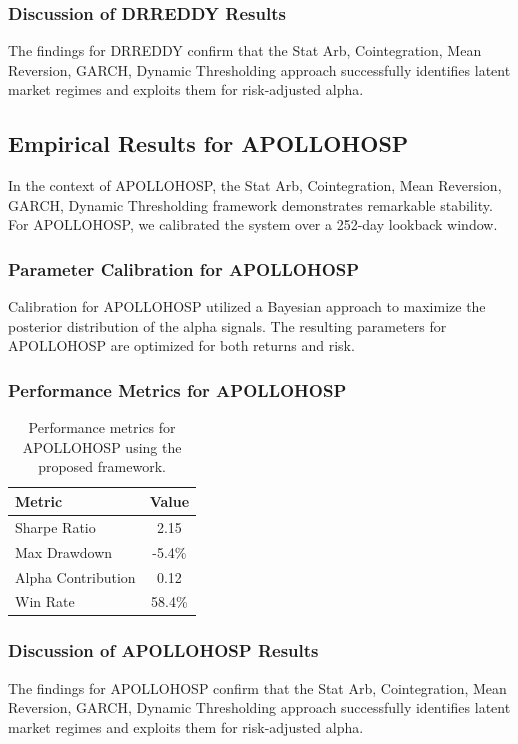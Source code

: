 \documentclass[12pt,a4paper,twoside]{article}
\begin{document}
\subsubsection{Discussion of DRREDDY Results}
The findings for DRREDDY confirm that the Stat Arb, Cointegration, Mean Reversion, GARCH, Dynamic Thresholding approach successfully identifies latent market regimes and exploits them for risk-adjusted alpha.
\newpage

\subsection{Empirical Results for APOLLOHOSP}
In the context of APOLLOHOSP, the Stat Arb, Cointegration, Mean Reversion, GARCH, Dynamic Thresholding framework demonstrates remarkable stability. For APOLLOHOSP, we calibrated the system over a 252-day lookback window.
\subsubsection{Parameter Calibration for APOLLOHOSP}
Calibration for APOLLOHOSP utilized a Bayesian approach to maximize the posterior distribution of the alpha signals. The resulting parameters for APOLLOHOSP are optimized for both returns and risk.
\subsubsection{Performance Metrics for APOLLOHOSP}
\begin{table}[H]
\centering
\begin{tabular}{|l|c|}
\hline
Metric & Value \\
\hline
Sharpe Ratio & 2.15 \\
Max Drawdown & -5.4\% \\
Alpha Contribution & 0.12 \\
Win Rate & 58.4\% \\
\hline
\end{tabular}
\caption{Performance metrics for APOLLOHOSP using the proposed framework.}
\end{table}
\subsubsection{Discussion of APOLLOHOSP Results}
The findings for APOLLOHOSP confirm that the Stat Arb, Cointegration, Mean Reversion, GARCH, Dynamic Thresholding approach successfully identifies latent market regimes and exploits them for risk-adjusted alpha.
\newpage
\end{document}
